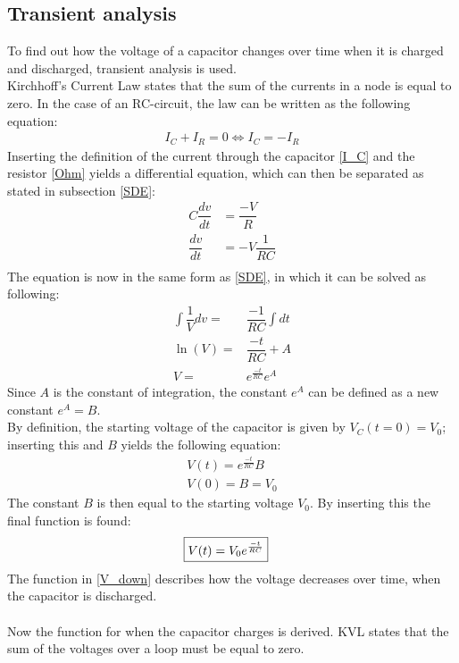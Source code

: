 \subsection{Transient analysis}
\label{sec371}
To find out how the voltage of a capacitor changes over time when it is charged and discharged, transient analysis is used.
\\
Kirchhoff's Current Law states that the sum of the currents in a node is equal to zero. In the case of an RC-circuit, the law can be written as the following equation:
\begin{align*}
I_{C}+I_{R}=0 \Leftrightarrow 
I_{C}= -I_{R}
\end{align*}
Inserting the definition of the current through the capacitor \eqref{I_C} and the resistor \eqref{Ohm} yields a differential equation, which can then be separated as stated in subsection \ref{SDE}:
\begin{align*}
C \dfrac{dv}{dt}&=\dfrac{-V}{R} \\
\dfrac{dv}{dt} &= -V\dfrac{1}{RC} \\
\end{align*}
The equation is now in the same form as \eqref{SDE}, in which it can be solved as following:
\begin{align*}
\int \dfrac{1}{V}dv =& \dfrac{-1}{RC} \int dt \\
\ln(V) =& \dfrac{-t}{RC} + A \\
V =& e^{\frac{-t}{RC}}e^{A}
\end{align*}
Since $A$ is the constant of integration, the constant $e^A$ can be defined as a new constant $e^A=B$.
\\
By definition, the starting voltage of the capacitor is given by $V_C(t=0)=V_0$; inserting this and $B$ yields the following equation: 
\begin{align}
V(t)= e^{\frac{-t}{RC}}B \\
V(0)= B = V_0
\end{align}
The constant $B$ is then equal to the starting voltage $V_0$. By inserting this the final function is found:
\begin{align}
\label{V_down}
\Aboxed{
 V(t) = V_0e^{\frac{-t}{RC}}
 }
\end{align}
The function in \eqref{V_down} describes how the voltage decreases over time, when the capacitor is discharged.
\\
\\
Now the function for when the capacitor charges is derived. KVL states that the sum of the voltages over a loop must be equal to zero. 

